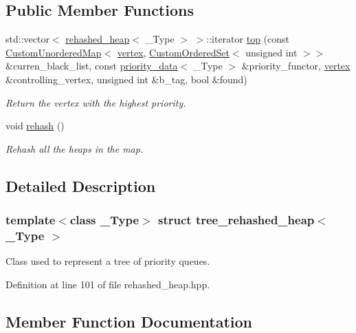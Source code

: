 \subsection*{Public Member Functions}
\begin{DoxyCompactItemize}
\item 
std\+::vector$<$ \hyperlink{structrehashed__heap}{rehashed\+\_\+heap}$<$ \+\_\+\+Type $>$ $>$\+::iterator \hyperlink{structtree__rehashed__heap_ae71af5931de670e3b2d159c70e9e4a4e}{top} (const \hyperlink{custom__map_8hpp_ad1ed68f2ff093683ab1a33522b144adc}{Custom\+Unordered\+Map}$<$ \hyperlink{graph_8hpp_abefdcf0544e601805af44eca032cca14}{vertex}, \hyperlink{classCustomOrderedSet}{Custom\+Ordered\+Set}$<$ unsigned int $>$$>$ \&curren\+\_\+black\+\_\+list, const \hyperlink{structpriority__data}{priority\+\_\+data}$<$ \+\_\+\+Type $>$ \&priority\+\_\+functor, \hyperlink{graph_8hpp_abefdcf0544e601805af44eca032cca14}{vertex} \&controlling\+\_\+vertex, unsigned int \&b\+\_\+tag, bool \&found)
\begin{DoxyCompactList}\small\item\em Return the vertex with the highest priority. \end{DoxyCompactList}\item 
void \hyperlink{structtree__rehashed__heap_a8d1fb20436b37ebc2595c2e6d8eb3fd1}{rehash} ()
\begin{DoxyCompactList}\small\item\em Rehash all the heaps in the map. \end{DoxyCompactList}\end{DoxyCompactItemize}


\subsection{Detailed Description}
\subsubsection*{template$<$class \+\_\+\+Type$>$\newline
struct tree\+\_\+rehashed\+\_\+heap$<$ \+\_\+\+Type $>$}

Class used to represent a tree of priority queues. 

Definition at line 101 of file rehashed\+\_\+heap.\+hpp.



\subsection{Member Function Documentation}
\mbox{\label{structtree__rehashed__heap_a8d1fb20436b37ebc2595c2e6d8eb3fd1}} 
